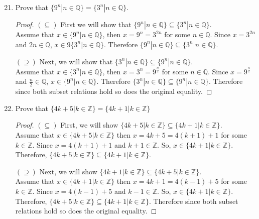 \documentclass{article}
\newcommand{\Z}{\mathbb{Z}}
\newcommand{\Q}{\mathbb{Q}}
\newcommand{\nitem}[1] %
{
	\setcounter{enumi}{#1}
	\addtocounter{enumi}{-1}
	\item
}
\begin{document}
\begin{enumerate}
		\nitem{20} Prove that $\{ 9^n| n \in \Q \} = \{ 3^n| n \in \Q \} $.
		\begin{proof}
			$(\subseteq)$ First we will show that $\{ 9^n| n \in \Q \} \subseteq \{ 3^n| n \in \Q \} $. \\
			Assume that $x \in \{ 9^n| n \in \Q \}$, then $x = 9^{n} =3^{2n}$ for some $n \in \Q$. Since $x = 3^{2n}$ and $2n \in \Q$, $x \in 9\{ 3^n| n \in \Q \} $. Therefore $\{ 9^n| n \in \Q \} \subseteq \{ 3^n| n \in \Q \} $. 
			
			$(\supseteq)$ Next, we will show that $\{ 3^n| n \in \Q \} \subseteq  \{ 9^n| n \in \Q \} $. \\
			Assume that $x \in \{ 3^n| n \in \Q \}$, then $x=3^{n} = 9^{\frac{n}{2}}$ for some $n \in \Q$. Since $x=9^{\frac{n}{2}}$ and $\frac{n}{2} \in \Q $, $x \in \{ 9^n| n \in \Q \}$. Therefore $\{ 3^n| n \in \Q \} \subseteq  \{ 9^n| n \in \Q \} $. Therefore since both subset relations hold so does the original equality.
		\end{proof}
		
		\nitem{26} Prove that $\{4k+5|k \in \Z\} = \{4k+1|k \in \Z\}$
		\begin{proof}
			$(\subseteq)$ First, we will show $\{4k+5|k \in \Z\} \subseteq \{4k+1|k \in \Z\}$.\\
			Assume that  $x \in \{4k+5|k \in \Z\} $ then $x =4k+5=4(k+1)+1$ for some $k \in \Z$.
			Since $x=4(k+1)+1$ and $k+1 \in \Z$. So, $x \in \{4k+1|k \in \Z\}$. 
			Therefore, $\{4k+5|k \in \Z\} \subseteq \{4k+1|k \in \Z\}$.
			
			$(\supseteq)$ Next, we will show $\{4k+1|k \in \Z\} \subseteq \{4k+5|k \in \Z\}$.\\
			Assume that  $x \in \{4k+1|k \in \Z\} $ then $x =4k+1=4(k-1)+5$ for some $k \in \Z$.
			Since $x=4(k-1)+5$ and $k-1 \in \Z$. So, $x \in \{4k+1|k \in \Z\}$.
			Therefore, $\{4k+5|k \in \Z\} \subseteq \{4k+1|k \in \Z\}$. Therefore since both subset relations hold so does the original equality.
		\end{proof}
	\end{enumerate}
	
\end{document}
